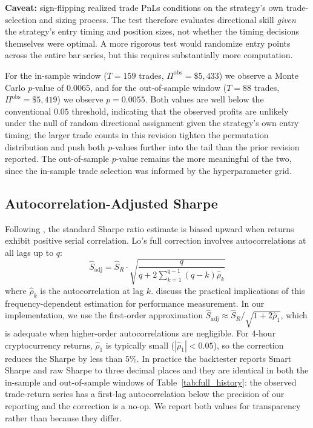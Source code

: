 \documentclass{article}
\begin{document}
\textbf{Caveat:} sign-flipping realized trade PnLs conditions on the strategy's own trade-selection and sizing process.
The test therefore evaluates directional skill \emph{given} the strategy's entry timing and position sizes, not whether the timing decisions themselves were optimal.
A more rigorous test would randomize entry points across the entire bar series, but this requires substantially more computation.

For the in-sample window ($T = 159$ trades, $\Pi^{\text{obs}} = \$5{,}433$) we observe a Monte Carlo $p$-value of $0.0065$, and for the out-of-sample window ($T = 88$ trades, $\Pi^{\text{obs}} = \$5{,}419$) we observe $p = 0.0055$.
Both values are well below the conventional $0.05$ threshold, indicating that the observed profits are unlikely under the null of random directional assignment given the strategy's own entry timing; the larger trade counts in this revision tighten the permutation distribution and push both $p$-values further into the tail than the prior revision reported.
The out-of-sample $p$-value remains the more meaningful of the two, since the in-sample trade selection was informed by the hyperparameter grid.

\subsection{Autocorrelation-Adjusted Sharpe}

Following \citet{lo2002statistics}, the standard Sharpe ratio estimate is biased upward when returns exhibit positive serial correlation.
Lo's full correction involves autocorrelations at all lags up to $q$:
\begin{equation}
  \hat{S}_{\text{adj}} = \hat{S}_R \cdot \sqrt{\frac{q}{q + 2\sum_{k=1}^{q-1}(q-k)\hat{\rho}_k}}
  \label{eq:smart_sharpe}
\end{equation}
where $\hat{\rho}_k$ is the autocorrelation at lag $k$.
\citet{kinlaw2015divergence} discuss the practical implications of this frequency-dependent estimation for performance measurement.
In our implementation, we use the first-order approximation $\hat{S}_{\text{adj}} \approx \hat{S}_R / \sqrt{1 + 2\hat{\rho}_1}$, which is adequate when higher-order autocorrelations are negligible.
For 4-hour cryptocurrency returns, $\hat{\rho}_1$ is typically small ($|\hat{\rho}_1| < 0.05$), so the correction reduces the Sharpe by less than 5\%.
In practice the backtester reports Smart Sharpe and raw Sharpe to three decimal places and they are identical in both the in-sample and out-of-sample windows of Table~\ref{tab:full_history}: the observed trade-return series has a first-lag autocorrelation below the precision of our reporting and the correction is a no-op.
We report both values for transparency rather than because they differ.
\end{document}
